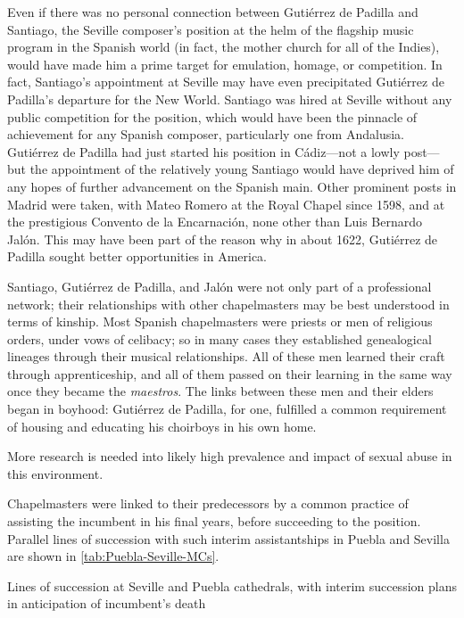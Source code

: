 Even if there was no personal connection between Gutiérrez de Padilla and
Santiago, the Seville composer's position at the helm of the flagship music
program in the Spanish world (in fact, the mother church for all of the Indies),
would have made him a prime target for emulation, homage, or competition.
In fact, Santiago's appointment at Seville may have even precipitated Gutiérrez
de Padilla's departure for the New World.
Santiago was hired at Seville without any public competition for the position,
which would have been the pinnacle of achievement for any Spanish composer,
particularly one from Andalusia.
Gutiérrez de Padilla had just started his position in Cádiz---not a lowly
post---but the appointment of the relatively young Santiago would have deprived
him of any hopes of further advancement on the Spanish main.
Other prominent posts in Madrid were taken, with Mateo Romero at the Royal
Chapel since 1598, and at the prestigious Convento de la Encarnación, none other
than Luis Bernardo Jalón.%
    \Autocite{Ezquerro:JalonLB} 
This may have been part of the reason why in about 1622, Gutiérrez de Padilla
sought better opportunities in America.

Santiago, Gutiérrez de Padilla, and Jalón were not only part of a professional
network; their relationships with other chapelmasters may be best understood in
terms of kinship.
Most Spanish chapelmasters were priests or men of religious orders, under vows
of celibacy; so in many cases they established genealogical lineages through
their musical relationships.
All of these men learned their craft through apprenticeship, and all of them
passed on their learning in the same way once they became the \emph{maestros}.
The links between these men and their elders began in boyhood: Gutiérrez de
Padilla, for one, fulfilled a common requirement of housing and educating his
choirboys in his own home.%
\begin{Footnote} 
    More research is needed into likely high prevalence and impact of sexual
    abuse in this environment.
\end{Footnote}
Chapelmasters were linked to their predecessors by a common practice of
assisting the incumbent in his final years, before succeeding to the position.
Parallel lines of succession with such interim assistantships in Puebla and
Sevilla are shown in \cref{tab:Puebla-Seville-MCs}.

{Lines of succession at Seville and Puebla cathedrals, with interim succession
plans in anticipation of incumbent's death}


